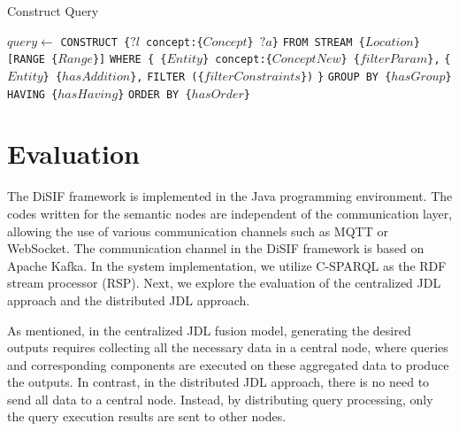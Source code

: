 \documentclass[5p,times]{elsarticle}
\begin{document}
\begin{algorithm}[t]
  \caption{Construct Query}\label{alg:constructquery}
  \begin{algorithmic}[1]
  
  \State $query \gets$
  \Statex \hspace{2em} \texttt{CONSTRUCT \{$?l$ concept:\{$Concept$\} $?a$\}} 
  \Statex \hspace{2em} \texttt{FROM STREAM \{$Location$\} [RANGE \{$Range$\}]}
  \Statex \hspace{2em} \texttt{WHERE \{ \{$Entity$\} concept:\{$ConceptNew$\} \{$filterParam$\},}
  \Statex \hspace{2em} \texttt{\{$Entity$\} \{$hasAddition$\},}
  \Statex \hspace{4em} \texttt{FILTER (\{$filterConstraints$\})}
  \Statex \hspace{2em} \texttt{\}}
  \Statex \hspace{2em} \texttt{GROUP BY \{$hasGroup$\}}
  \Statex \hspace{2em} \texttt{HAVING \{$hasHaving$\}}
  \Statex \hspace{2em} \texttt{ORDER BY \{$hasOrder$\}}
  
  \EndProcedure
  \end{algorithmic}
  \end{algorithm}

\section{Evaluation}

The DiSIF framework is implemented in the Java programming environment. The codes written for the semantic nodes are independent of the communication layer, allowing the use of various communication channels such as MQTT or WebSocket. The communication channel in the DiSIF framework is based on Apache Kafka. In the system implementation, we utilize C-SPARQL as the RDF stream processor (RSP). 
Next, we explore the evaluation of the centralized JDL approach and the distributed JDL approach.

As mentioned, in the centralized JDL fusion model, generating the desired outputs requires collecting all the necessary data in a central node, where queries and corresponding components are executed on these aggregated data to produce the outputs. In contrast, in the distributed JDL approach, there is no need to send all data to a central node. Instead, by distributing query processing, only the query execution results are sent to other nodes.
\end{document}
